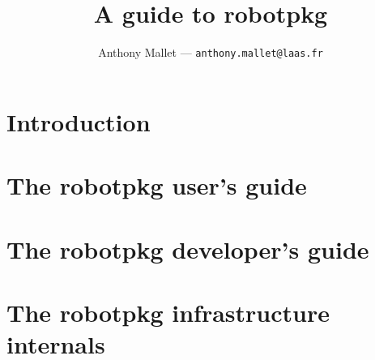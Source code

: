 \documentclass[11pt]{book}
\title{A guide to robotpkg}
\author{Anthony Mallet --- {\tt anthony.mallet@laas.fr}}
\begin{document}

\maketitle
\tableofcontents

\chapter{Introduction}
\label{chapter:introduction}


\chapter{The robotpkg user's guide}
\label{chapter:user}




\chapter{The robotpkg developer's guide}
\label{chapter:developer}

\chapter{The robotpkg infrastructure internals}
\label{chapter:internal}
\end{document}
